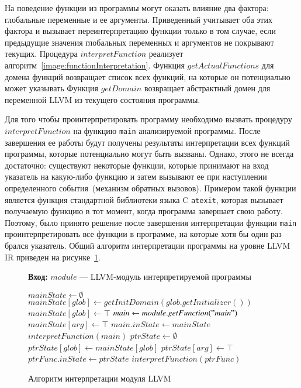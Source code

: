 На поведение функции из программы могут оказать влияние два фактора: 
глобальные переменные и ее аргументы. Приведенный учитывает оба этих фактора
и вызывает переинтерпретацию функции только в том случае, если предыдущие
значения глобальных переменных и аргументов не покрывают текущих. Процедура 
$interpretFunction$ реализует алгоритм~\ref{image:functionInterpretation}. 
Функция $getActualFunctions$ для домена функций возвращает список всех 
функций, на которые он потенциально может указывать Функция $getDomain$ 
возвращает абстрактный домен для переменной LLVM из текущего состояния 
программы.

Для того чтобы проинтерпретировать программу необходимо вызвать процедуру 
$interpretFunction$ на функцию \texttt{main} анализируемой программы. После 
завершения ее работы будут получены результаты интерпретации всех функций
программы, которые потенциально могут быть вызваны. Однако, этого не всегда
достаточно: существуют некоторые функции, которые принимают на вход указатель
на какую-либо функцию и затем вызывают ее при наступлении определенного 
события~(механизм обратных вызовов). Примером такой функции является функция
стандартной библиотеки языка C \texttt{atexit}, которая вызывает получаемую 
функцию в тот момент, когда программа завершает свою работу. Поэтому, было
принято решение после завершения интерпретации функции \texttt{main}
проинтерпретировать все функции в программе, на которые хотя бы один раз
брался указатель. Общий алгоритм интерпретации программы на уровне LLVM IR 
приведен на рисунке~\ref{image:irInterpretation}.
\begin{figure}[h!]
\textbf{Вход:} $module$ --- LLVM-модуль интерпретируемой программы

\begin{algorithmic}[1]
\State $mainState \gets \emptyset$
        \State $mainState[glob] \gets getInitDomain(glob.getInitializer())$
    \Else
        \State $mainState[glob] \gets \top$
    \EndIf
\EndFor
\State $main \gets module.getFunction("main")$
    \State $mainState[arg] \gets \top$
\EndFor
\State $main.inState \gets mainState$
\State $interpretFunction(main)$
    \State $ptrState \gets \emptyset$
        \State $ptrState[glob] \gets mainState[glob]$
    \EndFor
        \State $ptrState[arg] \gets \top$
    \EndFor
    \State $ptrFunc.inState \gets ptrState$
    \State $interpretFunction(ptrFunc)$
\EndFor
\end{algorithmic}
\caption{Алгоритм интерпретации модуля LLVM}
\label{image:irInterpretation}
\end{figure}

